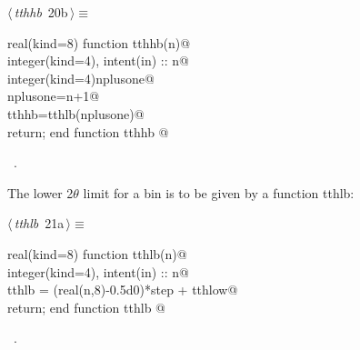\documentclass[10pt,a4paper,notitlepage]{article}
\begin{document}
\begin{flushleft} \small
\begin{minipage}{\linewidth}\label{scrap24}\raggedright\small
{} $\langle\,${\it tthhb}\nobreak\ {\footnotesize {20b}}$\,\rangle\equiv$
\vspace{-1ex}
\begin{list}{}{} \item
\mbox{}\verb@      real(kind=8) function tthhb(n)@\\
\mbox{}\verb@      integer(kind=4), intent(in) :: n@\\
\mbox{}\verb@      integer(kind=4)nplusone@\\
\mbox{}\verb@      nplusone=n+1@\\
\mbox{}\verb@      tthhb=tthlb(nplusone)@\\
\mbox{}\verb@      return; end function tthhb                                             @{\NWsep}
\end{list}
\vspace{-1.5ex}
\footnotesize
\begin{list}{}{\setlength{\itemsep}{-\parsep}\setlength{\itemindent}{-\leftmargin}}
\item \NWtxtMacroRefIn\ .

\item{}
\end{list}
\end{minipage}\vspace{4ex}
\end{flushleft}
The lower 2$\theta$ limit for a bin is to be given by a function tthlb:
\begin{flushleft} \small
\begin{minipage}{\linewidth}\label{scrap25}\raggedright\small
{} $\langle\,${\it tthlb}\nobreak\ {\footnotesize {21a}}$\,\rangle\equiv$
\vspace{-1ex}
\begin{list}{}{} \item
\mbox{}\verb@      real(kind=8) function tthlb(n)@\\
\mbox{}\verb@      integer(kind=4), intent(in) :: n@\\
\mbox{}\verb@      tthlb = (real(n,8)-0.5d0)*step + tthlow@\\
\mbox{}\verb@      return; end function tthlb                                      @{\NWsep}
\end{list}
\vspace{-1.5ex}
\footnotesize
\begin{list}{}{\setlength{\itemsep}{-\parsep}\setlength{\itemindent}{-\leftmargin}}
\item \NWtxtMacroRefIn\ .

\item{}
\end{list}
\end{minipage}\vspace{4ex}
\end{flushleft}
\end{document}
